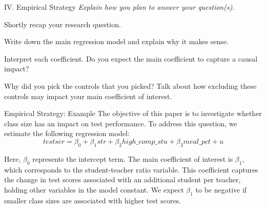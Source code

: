 \documentclass{./../Lectures/div_teaching_slides}
\begin{document}
\begin{frame}{IV. Empirical Strategy}
\textit{Explain how you plan to answer your question(s)}. \\
\begin{witemize}
  \item Shortly recap your research question.
  \item Write down the main regression model and explain why it makes sense. \\ \vspace{0.5em}
\begin{witemize}
\normalsize
  \item Interpret each coefficient. Do you expect the main coefficient to capture a causal impact?
  \item Why did you pick the controls that you picked? Talk about how excluding these controls may impact your main coefficient of interest.
  \end{witemize}
\end{witemize}
\end{frame}

\begin{frame}{Empirical Strategy: Example}
\small
The objective of this paper is to investigate whether class size has an impact on test performance. To address this question, we estimate the following regression model:
$$ testscr = \beta_0 + \beta_1 str + \beta_2 high\_comp\_stu + \beta_3 meal\_pct + u $$

Here, $\beta_0$ represents the intercept term. The main coefficient of interest is $\beta_1$, which corresponds to the student-teacher ratio variable. This coefficient captures the change in test scores associated with an additional student per teacher, holding other variables in the model constant. We expect $\beta_1$ to be negative if smaller class sizes are associated with higher test scores. 
\end{frame}
\end{document}
